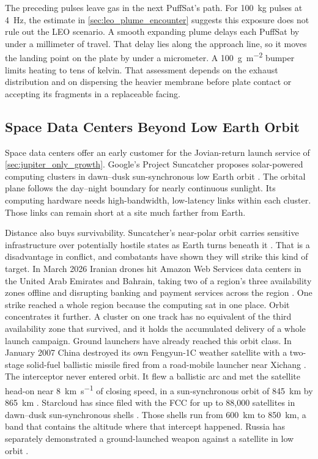 \documentclass{article}
\begin{document}
The preceding pulses leave gas in the next PuffSat's path. For \SI{100}{\kilogram} pulses at \SI{4}{\hertz}, the estimate in \autoref{sec:leo_plume_encounter} suggests this exposure does not rule out the LEO scenario. A smooth expanding plume delays each PuffSat by under a millimeter of travel. That delay lies along the approach line, so it moves the landing point on the plate by under a micrometer. A \SI{100}{\gram\per\square\meter} bumper limits heating to tens of kelvin. That assessment depends on the exhaust distribution and on dispersing the heavier membrane before plate contact or accepting its fragments in a replaceable facing.

\subsection{Space Data Centers Beyond Low Earth Orbit}\label{sec:space_data_centers}
Space data centers offer an early customer for the Jovian-return launch service of \autoref{sec:jupiter_only_growth}. Google's Project Suncatcher proposes solar-powered computing clusters in dawn--dusk sun-synchronous low Earth orbit \cite{aguera2026_suncatcher}. The orbital plane follows the day--night boundary for nearly continuous sunlight. Its computing hardware needs high-bandwidth, low-latency links within each cluster. Those links can remain short at a site much farther from Earth.

Distance also buys survivability. Suncatcher's near-polar orbit carries sensitive infrastructure over potentially hostile states as Earth turns beneath it \cite{nasa_orbit_catalog}. That is a disadvantage in conflict, and combatants have shown they will strike this kind of target. In March 2026 Iranian drones hit Amazon Web Services data centers in the United Arab Emirates and Bahrain, taking two of a region's three availability zones offline and disrupting banking and payment services across the region \cite{gatech2026_aws_strike,cnbc2026_aws_strike}. One strike reached a whole region because the computing sat in one place. Orbit concentrates it further. A cluster on one track has no equivalent of the third availability zone that survived, and it holds the accumulated delivery of a whole launch campaign. Ground launchers have already reached this orbit class. In January 2007 China destroyed its own Fengyun-1C weather satellite with a two-stage solid-fuel ballistic missile fired from a road-mobile launcher near Xichang \cite{kan2007_asat}. The interceptor never entered orbit. It flew a ballistic arc and met the satellite head-on near \SI{8}{\kilo\meter\per\second} of closing speed, in a sun-synchronous orbit of \SI{845}{\kilo\meter} by \SI{865}{\kilo\meter} \cite{nasa_odqn2007_fengyun}. Starcloud has since filed with the FCC for up to 88,000 satellites in dawn--dusk sun-synchronous shells \cite{foust2026_starcloud_fcc}. Those shells run from \SI{600}{\kilo\meter} to \SI{850}{\kilo\meter}, a band that contains the altitude where that intercept happened. Russia has separately demonstrated a ground-launched weapon against a satellite in low orbit \cite{dia2022_space_security}.
\end{document}
